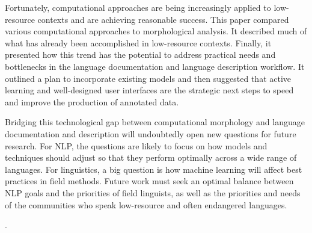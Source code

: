 \documentclass[12pt]{article}
\begin{document}
Fortunately, computational approaches are being increasingly applied to low-resource contexts and are achieving reasonable success. This paper compared various computational approaches to morphological analysis. It described much of what has already been accomplished in low-resource contexts. Finally, it presented how this trend has the potential to address practical needs and bottlenecks in the language documentation and language description workflow. It outlined a plan to incorporate existing models and then suggested that active learning and well-designed user interfaces are the strategic next steps to speed and improve the production of annotated data. 

Bridging this technological gap between computational morphology and language documentation and description will undoubtedly open new questions for future research. For NLP, the questions are likely to focus on how models and techniques should adjust so that they perform optimally across a wide range of languages. For linguistics, a big question is how machine learning will affect best practices in field methods. Future work must seek an optimal balance between NLP goals and the priorities of field linguists, as well as the priorities and needs of the communities who speak low-resource and often endangered languages. 

\newp.



\end{document}
